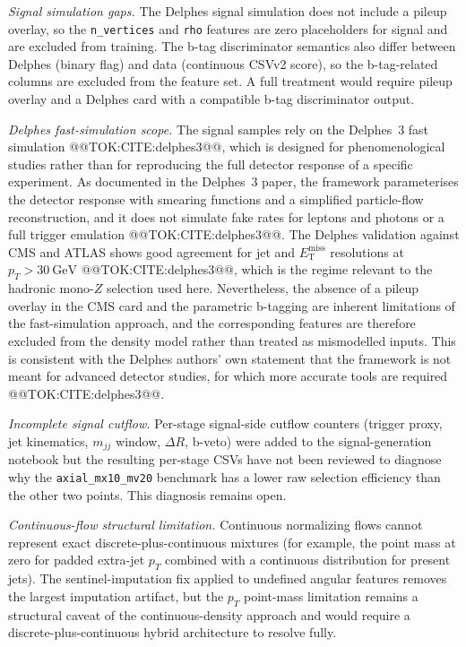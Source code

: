 \documentclass[11pt]{article}
\newcommand{\GeV}{\text{GeV}}
\newcommand{\MET}{\ensuremath{E_{\mathrm{T}}^{\mathrm{miss}}}}
\begin{document}
\textit{Signal simulation gaps.}
The Delphes signal simulation does not include a pileup overlay, so the
\texttt{n\_vertices} and \texttt{rho} features are zero placeholders for
signal and are excluded from training. The b-tag discriminator semantics
also differ between Delphes (binary flag) and data (continuous CSVv2 score),
so the b-tag-related columns are excluded from the feature set. A full
treatment would require pileup overlay and a Delphes card with a compatible
b-tag discriminator output.

\textit{Delphes fast-simulation scope.}
The signal samples rely on the Delphes~3 fast simulation
@@TOK:CITE:delphes3@@, which is designed for phenomenological studies rather than
for reproducing the full detector response of a specific experiment. As
documented in the Delphes~3 paper, the framework parameterises the detector
response with smearing functions and a simplified particle-flow
reconstruction, and it does not simulate fake rates for leptons and photons
or a full trigger emulation @@TOK:CITE:delphes3@@. The Delphes validation against
CMS and ATLAS shows good agreement for jet and \MET{} resolutions at
$p_T > 30~\GeV$ @@TOK:CITE:delphes3@@, which is the regime relevant to the
hadronic mono-$Z$ selection used here. Nevertheless, the absence of a
pileup overlay in the CMS card and the parametric b-tagging are inherent
limitations of the fast-simulation approach, and the corresponding features
are therefore excluded from the density model rather than treated as
mismodelled inputs. This is consistent with the Delphes authors' own
statement that the framework is not meant for advanced detector studies,
for which more accurate tools are required @@TOK:CITE:delphes3@@.

\textit{Incomplete signal cutflow.}
Per-stage signal-side cutflow counters (trigger proxy, jet kinematics,
$m_{jj}$ window, $\Delta R$, b-veto) were added to the signal-generation
notebook but the resulting per-stage CSVs have not been reviewed to diagnose
why the \texttt{axial\_mx10\_mv20} benchmark has a lower raw selection
efficiency than the other two points. This diagnosis remains open.

\textit{Continuous-flow structural limitation.}
Continuous normalizing flows cannot represent exact discrete-plus-continuous
mixtures (for example, the point mass at zero for padded extra-jet $p_T$
combined with a continuous distribution for present jets). The
sentinel-imputation fix applied to undefined angular features removes the
largest imputation artifact, but the $p_T$ point-mass limitation remains a
structural caveat of the continuous-density approach and would require a
discrete-plus-continuous hybrid architecture to resolve fully.
\end{document}
